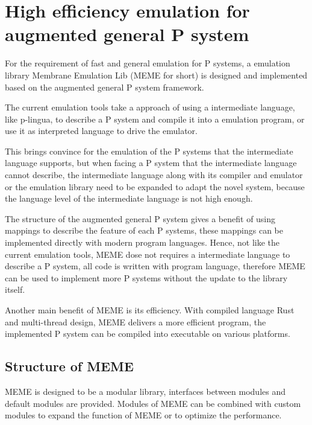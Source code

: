 \documentclass[9pt,a4paper,twoside]{article}
\begin{document}
    \section{High efficiency emulation for augmented general P system}

    For the requirement of fast and general emulation for P systems, a emulation library Membrane Emulation Lib (MEME for short) is designed and implemented based on the augmented general P system framework.

    The current emulation tools take a approach of using a intermediate language, like p-lingua, to describe a P system and compile it into a emulation program, or use it as interpreted language to drive the emulator. 
    
    This brings convince for the emulation of the P systems that the intermediate language supports, but when facing a P system that the intermediate language cannot describe, the intermediate language along with its compiler and emulator or the emulation library need to be expanded to adapt the novel system, because the language level of the intermediate language is not high enough.

    The structure of the augmented general P system gives a benefit of using mappings to describe the feature of each P systems, these mappings can be implemented directly with modern program languages. Hence, not like the current emulation tools, MEME dose not requires a intermediate language to describe a P system, all code is written with program language, therefore MEME can be used to implement more P systems without the update to the library itself.

    Another main benefit of MEME is its efficiency. With compiled language Rust and multi-thread design, MEME delivers a more efficient program, the implemented P system can be compiled into executable on various platforms.

    \subsection{Structure of MEME}
    MEME is designed to be a modular library, interfaces between modules and default modules are provided. 
    Modules of MEME can be combined with custom modules to expand the function of MEME or to optimize the performance. 
\end{document}
